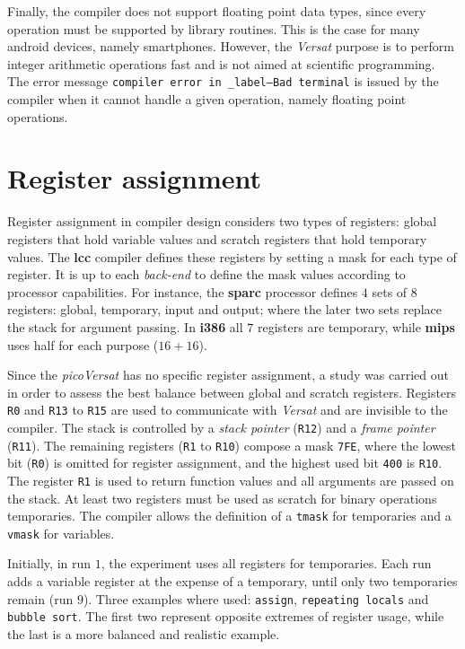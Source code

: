 Finally, the compiler does not support floating point
data types, since every operation must be supported
by library routines.
This is the case for many android devices, namely
smartphones.
However, the {\it Versat} purpose is to perform
integer arithmetic operations fast and is not aimed at
scientific programming.
The error message {\tt compiler error in \_label--Bad terminal}
is issued by the compiler when it cannot handle a given operation,
namely floating point operations.

\section{Register assignment}

Register assignment in compiler design considers two types of registers:
global registers that hold variable values and scratch registers that hold
temporary values.
The {\bf lcc} compiler defines these registers by setting a mask for each
type of register.
It is up to each {\it back-end} to define the mask values according to processor
capabilities.
For instance, the {\bf sparc} processor defines $4$ sets of $8$ registers:
global, temporary, input and output; where the later two sets replace
the stack for argument passing.
In {\bf i386} all $7$ registers are temporary, while {\bf mips} uses half
for each purpose ($16+16$).

Since the {\it picoVersat} has no specific register assignment, a study
was carried out in order to assess the best balance between global and
scratch registers.
Registers {\tt R0} and {\tt R13} to {\tt R15} are used to communicate with {\it Versat}
and are invisible to the compiler.
The stack is controlled by a {\it stack pointer} ({\tt R12}) and a {\it frame pointer}
({\tt R11}).
The remaining registers ({\tt R1} to {\tt R10}) compose a mask {\tt 7FE}, where
the lowest bit ({\tt R0}) is omitted for register assignment, and the highest
used bit {\tt 400} is {\tt R10}.
The register {\tt R1} is used to return function values and all arguments are
passed on the stack.
At least two registers must be used as scratch for binary operations
temporaries.
The compiler allows the definition of a {\tt tmask} for temporaries and a
{\tt vmask} for variables.

Initially, in run $1$, the experiment uses all registers for temporaries.
Each run adds a variable register at the expense of a temporary, until only
two temporaries remain (run $9$).
Three examples where used: {\tt assign}, {\tt repeating locals} and
{\tt bubble sort}.
The first two represent opposite extremes of register usage, while the last is
a more balanced and realistic example.

